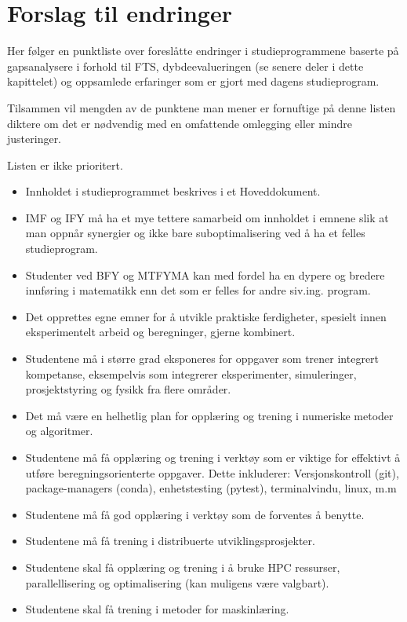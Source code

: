 \section{Forslag til endringer}

Her følger en punktliste over foreslåtte endringer i studieprogrammene baserte på gapsanalysere i forhold til FTS, dybdeevalueringen (se senere deler i dette kapittelet) og oppsamlede erfaringer som er gjort med dagens studieprogram.

Tilsammen vil mengden av de punktene man mener er fornuftige på denne listen diktere om det er nødvendig med en omfattende omlegging eller mindre justeringer.

Listen er ikke prioritert.

\begin{itemize}
	\item Innholdet i studieprogrammet beskrives i et Hoveddokument.
	\item IMF og IFY må ha et mye tettere samarbeid om innholdet i emnene slik at man oppnår synergier og ikke bare suboptimalisering ved å ha et felles studieprogram.
	\item Studenter ved BFY og MTFYMA kan med fordel ha en dypere og bredere innføring i matematikk enn det som er felles for andre siv.ing. program.
	\item Det opprettes egne emner for å utvikle praktiske ferdigheter, spesielt innen eksperimentelt arbeid og beregninger, gjerne kombinert.
	\item Studentene må i større grad eksponeres for oppgaver som trener integrert kompetanse, eksempelvis som integrerer eksperimenter, simuleringer, prosjektstyring og fysikk fra flere områder.
	\item Det må være en helhetlig plan for opplæring og trening i numeriske metoder og algoritmer.
	\item Studentene må få opplæring og trening i verktøy som er viktige for effektivt å utføre beregningsorienterte oppgaver. Dette inkluderer: Versjonskontroll (git), package-managers (conda), enhetstesting (pytest), terminalvindu, linux, m.m
	\item Studentene må få god opplæring i verktøy som de forventes å benytte.
	\item Studentene må få trening i distribuerte utviklingsprosjekter.
	\item Studentene skal få opplæring og trening i å bruke HPC ressurser, parallellisering og optimalisering (kan muligens være valgbart).
	\item Studentene skal få trening i metoder for maskinlæring.

\end{itemize}
